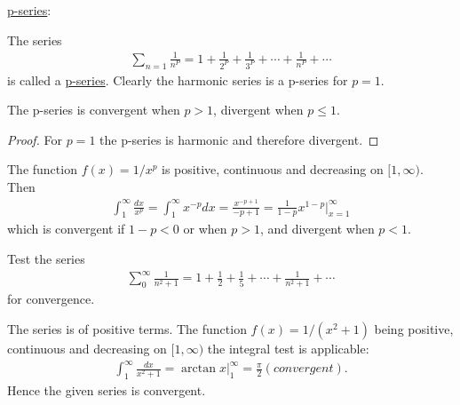 \documentclass[11pt]{amsbook}
\begin{document}

\underline{p-series}:\par
The series
\begin{align*}
	\sum_{n=1} 
	\frac
		{1}
		{n^{P}}
	=1 
	+ \frac
		{1}
		{2^{P}} 
	+ \frac
		{1}
		{3^{P}} 
	+ \cdots 
	+ \frac
		{1}
		{n^{P}} 
	+ \cdots
\end{align*}
is called a \underline{p-series}. Clearly the harmonic series is a p-series for $p=1$.

\begin{thm}
	The p-series is convergent when $p>1$, divergent when $p\leq1$.
	\begin{proof}
		For $p=1$ the p-series is harmonic and therefore divergent.
	\end{proof}
\end{thm}

The function $f(x) = 1/x^{p}$ is positive, continuous and decreasing on $[1, \infty)$. Then
\begin{align*}
	\int_1^\infty
	 \frac
		{dx}
		{x^{p}} 
	= \int_1^\infty x^{-p}dx 
	= \frac
		{x^{-p+1}}
		{-p+1} 
	= \frac
		{1}
		{1-p} 
	 x^{1-p}
	\biggl|_
		{x=1}
		^\infty
\end{align*}
which is convergent if $1 - p < 0$  or when $p>1$, and divergent when $p<1$.

\begin{exmp}
	Test the series
	\begin{align*}
		\sum_0^\infty 
		\frac
			{1}
			{{n^2}+1} 
		= 1 
		+ \frac
			{1}
			{2} 
		+ \frac
			{1}
			{5} 
		+ \cdots 
		+ \frac
			{1}
			{{n^2}+1} 
		+ \cdots
	\end{align*}
	for convergence.
	\begin{hSolution}
		The series is of positive terms. The function $f(x) = 1/({x^2}+1)$ being positive, continuous and decreasing on $[1, \infty)$  the integral test is applicable:
		\begin{align*}
			\int_1^\infty 
			\frac
				{dx}
				{{x^2}+1} 
			= \arctan x
			\biggl|_
				1
				^\infty 
			= \frac
				{\pi}
				{2} 
			 (convergent).
		\end{align*}
		Hence the given series is convergent.
	\end{hSolution}
\end{exmp}
\end{document}
